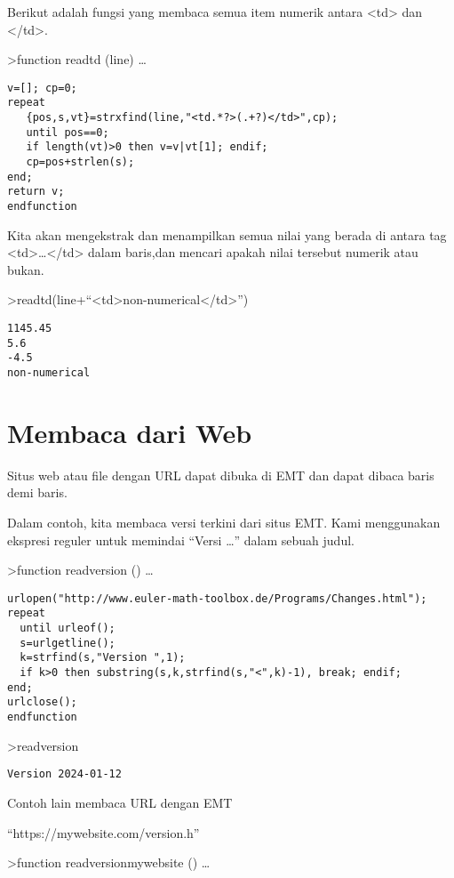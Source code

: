 \documentclass[
]{book}
\begin{document}
Berikut adalah fungsi yang membaca semua item numerik antara \textless td\textgreater{} dan \textless/td\textgreater.

\textgreater function readtd (line) \ldots{}

\begin{verbatim}
v=[]; cp=0;
repeat
   {pos,s,vt}=strxfind(line,"<td.*?>(.+?)</td>",cp);
   until pos==0;
   if length(vt)>0 then v=v|vt[1]; endif;
   cp=pos+strlen(s);
end;
return v;
endfunction
\end{verbatim}

Kita akan mengekstrak dan menampilkan semua nilai yang berada di antara tag \textless td\textgreater\ldots\textless/td\textgreater{} dalam baris,dan mencari apakah nilai tersebut numerik atau bukan.

\textgreater readtd(line+``\textless td\textgreater non-numerical\textless/td\textgreater{}'')

\begin{verbatim}
1145.45
5.6
-4.5
non-numerical
\end{verbatim}

\chapter{Membaca dari Web}\label{membaca-dari-web}

Situs web atau file dengan URL dapat dibuka di EMT dan dapat dibaca baris demi baris.

Dalam contoh, kita membaca versi terkini dari situs EMT. Kami menggunakan ekspresi reguler untuk memindai ``Versi \ldots{}'' dalam sebuah judul.

\textgreater function readversion () \ldots{}

\begin{verbatim}
urlopen("http://www.euler-math-toolbox.de/Programs/Changes.html");
repeat
  until urleof();
  s=urlgetline();
  k=strfind(s,"Version ",1);
  if k>0 then substring(s,k,strfind(s,"<",k)-1), break; endif;
end;
urlclose();
endfunction
\end{verbatim}

\textgreater readversion

\begin{verbatim}
Version 2024-01-12
\end{verbatim}

Contoh lain membaca URL dengan EMT

``https://mywebsite.com/version.h''

\textgreater function readversionmywebsite () \ldots{}
\end{document}
